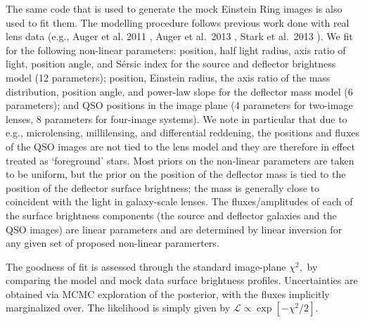 \documentclass[a4paper,11pt]{article}
\begin{document}
{The same code that is used to generate the mock Einstein Ring images
is also used to fit them. The
modelling procedure follows previous work done with real lens data (e.g., Auger et al. 2011
\cite{2011MNRAS.411L...6A}, Auger et al.~2013 \cite{2013MNRAS.436..503A}, Stark et al.~2013
\cite{2013MNRAS.436.1040S}).
We fit for the following non-linear parameters: position, half light radius, axis
ratio of light, position angle, and S{\'e}rsic index for the
source and deflector brightness model (12 parameters); position, Einstein radius, the
axis ratio of the mass distribution, position angle, and power-law
slope for the deflector mass model (6 parameters); and QSO positions in the image
plane (4 parameters for two-image lenses, 8 parameters for four-image systems). We note in particular
that due to e.g., microlensing, millilensing, and differential reddening, the
positions and fluxes of the QSO images are not tied to the lens model and
they are therefore in effect treated as `foreground' stars. Most priors on the non-linear
parameters are taken to be uniform, but the prior on the position of the deflector
mass is tied to the position of the deflector surface brightness;
the mass is generally close to coincident with the light in galaxy-scale lenses.
The fluxes/amplitudes of each of the surface brightness components
(the source and deflector galaxies and the QSO images) are linear parameters and are determined
by linear inversion for any given set of proposed non-linear paramerters.


The goodness of fit is assessed through the standard
image-plane $\chi^{2},$ by comparing the model and mock data surface
brightness profiles.  Uncertainties are obtained via MCMC exploration
of the posterior, with the fluxes implicitly marginalized over. The likelihood is simply given by
$\mathcal{L}\propto\exp[-\chi^{2}/2]$.
%
%

}
\end{document}
